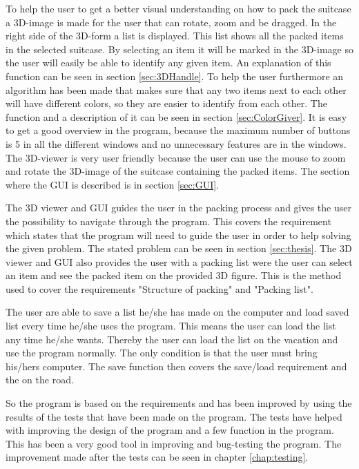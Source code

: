 To help the user to get a better visual understanding on how to pack the suitcase a 3D-image is made for the user that can rotate, zoom and be dragged. In the right side of the 3D-form a list is displayed. This list shows all the packed items in the selected suitcase. By selecting an item it will be marked in the 3D-image so the user will easily be able to identify any given item. An explanation of this function can be seen in section \ref{sec:3DHandle}. To help the user furthermore an algorithm has been made that makes sure that any two items next to each other will have different colors, so they are easier to identify from each other. The function and a description of it can be seen in section \ref{sec:ColorGiver}.
It is easy to get a good overview in the program, because the maximum number of buttons is 5 in all the different windows and no unnecessary features are in the windows. The 3D-viewer is very user friendly because the user can use the mouse to zoom and rotate the 3D-image of the suitcase containing the packed items. The section where the GUI is described is in section \ref{sec:GUI}.

The 3D viewer and GUI guides the user in the packing process and gives the user the possibility to navigate through the program. This covers the requirement which states that the program will need to guide the user in order to help solving the given problem. The stated problem can be seen in section \ref{sec:thesis}. The 3D viewer and GUI also provides the user with a packing list were the user can select an item and see the packed item on the provided 3D figure. This is the method used to cover the requirements "Structure of packing" and "Packing list".

The user are able to save a list he/she has made on the computer and load saved list every time he/she uses the program. This means the user can load the list any time he/she wants. Thereby the user can load the list on the vacation and use the program normally. The only condition is that the user must bring his/hers computer. The save function then covers the save/load requirement and the on the road.

So the program is based on the requirements and has been improved by using the results of the tests that have been made on the program. The tests have helped with improving the design of the program and a few function in the program. This has been a very good tool in improving and bug-testing the program. The improvement made after the tests can be seen in chapter \ref{chap:testing}.

